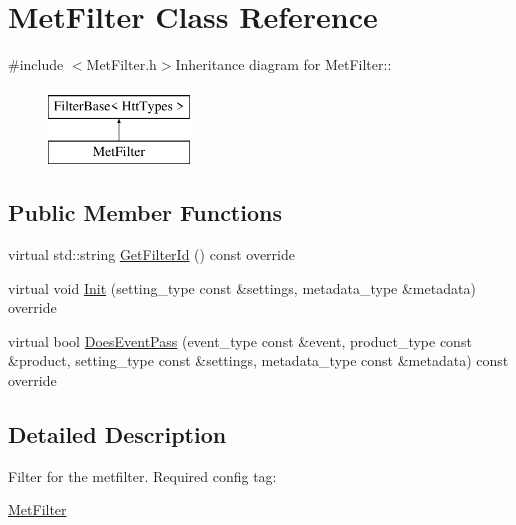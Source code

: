 \hypertarget{classMetFilter}{
\section{MetFilter Class Reference}
\label{classMetFilter}
}


{\ttfamily \#include $<$MetFilter.h$>$}Inheritance diagram for MetFilter::\begin{figure}[H]
\begin{center}
\leavevmode
\includegraphics[height=2cm]{classMetFilter}
\end{center}
\end{figure}
\subsection*{Public Member Functions}
\begin{DoxyCompactItemize}
\item 
virtual std::string \hyperlink{classMetFilter_a87ef009255db01cd6c5b36f8304c9366}{GetFilterId} () const override
\item 
virtual void \hyperlink{classMetFilter_a0021979947fb228dde496d0a7c4c16d1}{Init} (setting\_\-type const \&settings, metadata\_\-type \&metadata) override
\item 
virtual bool \hyperlink{classMetFilter_a341f5c453bdcde081b8e524a9c8dfdc3}{DoesEventPass} (event\_\-type const \&event, product\_\-type const \&product, setting\_\-type const \&settings, metadata\_\-type const \&metadata) const override
\end{DoxyCompactItemize}


\subsection{Detailed Description}
Filter for the metfilter. Required config tag:
\begin{DoxyItemize}
\item \hyperlink{classMetFilter}{MetFilter} 
\end{DoxyItemize}

